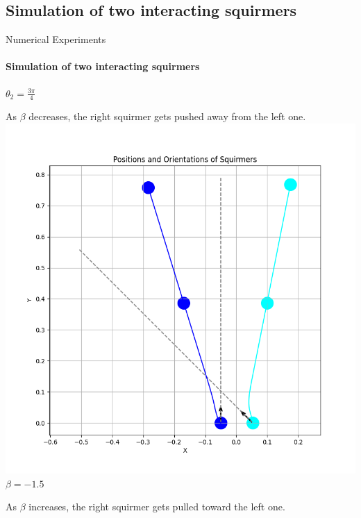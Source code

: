 \documentclass{beamer}
\begin{document}
\subsection{Simulation of two interacting squirmers}
\begin{frame}{Numerical Experiments}
    \framesubtitle{Simulation of two interacting squirmers}
    \begin{center}
        \textbf{$\theta_2 = \frac{3\pi}{4}$}
    \end{center}
    \begin{minipage}{0.49\textwidth}
        \centering
        As $\beta$ decreases, the right squirmer gets pushed away from the left one.
        \includegraphics[width=1\textwidth]{../../graphs/simulations/sim_sq_sq/betam1_5/3pi_4_.png}
        $\beta = -1.5$
    \end{minipage}
    \begin{minipage}{0.49\textwidth}
        \centering
        As $\beta$ increases, the right squirmer gets pulled toward the left one.

\end{minipage}
\end{frame}
\end{document}
